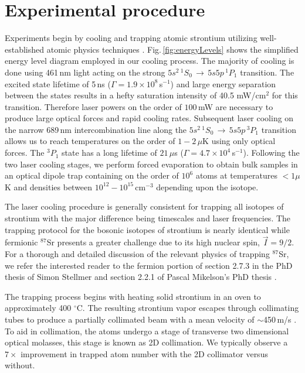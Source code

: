 \section{Experimental procedure} \label{sec:trapping}
\setcounter{footnote}{0}
Experiments begin by cooling and trapping atomic strontium utilizing well-established atomic physics techniques \cite{mvs99,Katori1999,Ido2000,Nagel2003,Mukaiyama2003a,Loftus2004,mmy09a,sth09a,Mickelson2010ja,Tey2010a,dym10,stg10}.
Fig.\,\ref{fig:energyLevels} shows the simplified energy level diagram employed in our cooling process.
The majority of cooling is done using 461\,nm light acting on the strong $5s^2\,^1S_0\,\rightarrow\,5s5p\,^1P_1$ transition.
The excited state lifetime of 5\,ns ($\Gamma=1.9 \times 10^8$\,s$^{-1}$) and large energy separation between the states results in a hefty saturation intensity of 40.5 mW/cm$^2$ for this transition.
Therefore laser powers on the order of $100\,$mW are necessary to produce large optical forces and rapid cooling rates.
Subsequent laser cooling on the narrow 689\,nm intercombination line along the $5s^2\,^1S_0\,\rightarrow\,5s5p\,^3P_1$ transition allows us to reach temperatures on the order of $1-2\,\mu$K using only optical forces.
The $^3P_1$ state has a long lifetime of $21\,\mu$s ($\Gamma=4.7 \times 10^4$\,s$^{-1}$).
Following the two laser cooling stages, we perform forced evaporation to obtain bulk samples in an optical dipole trap containing on the order of $10^6$ atoms at temperatures $<1\mu$K and densities between $10^{12} - 10^{15}\,$cm$^{-3}$ depending upon the isotope. 

The laser cooling procedure is generally consistent for trapping all isotopes of strontium with the major difference being timescales and laser frequencies.
The trapping protocol for the bosonic isotopes of strontium is nearly identical while fermionic $^{87}$Sr presents a greater challenge due to its high nuclear spin, $\vec{I}=9/2$.
For a thorough and detailed discussion of the relevant physics of trapping $^{87}$Sr, we refer the interested reader to the fermion portion of section 2.7.3 in the PhD thesis of Simon Stellmer \cite{SimonStellmer2013} and section 2.2.1 of Pascal Mikelson's PhD thesis \cite{Mickelson2010b}.

The trapping process begins with heating solid strontium in an oven to approximately 400 $^{\circ}$C. 
The resulting strontium vapor escapes through collimating tubes to produce a partially collimated beam with a mean velocity of $\sim$450\,m/s \cite{Mazurenko2010}.
To aid in collimation, the atoms undergo a stage of transverse two dimensional optical molasses, this stage is known as 2D collimation.
We typically observe a $7\times$ improvement in trapped atom number with the 2D collimator versus without.

